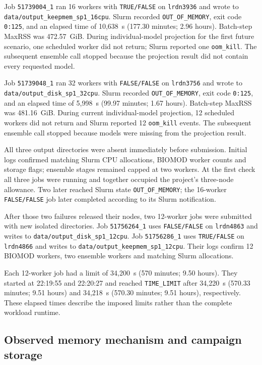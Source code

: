 Job \texttt{51739004\_1} ran 16 workers with \texttt{TRUE/FALSE} on \texttt{lrdn3936} and wrote to \nolinkurl{data/output_keepmem_sp1_16cpu}. Slurm recorded \texttt{OUT\_OF\_MEMORY}, exit code \texttt{0:125}, and an elapsed time of 10,638~s (177.30 minutes; 2.96 hours). Batch-step MaxRSS was 472.57~GiB. During individual-model projection for the first future scenario, one scheduled worker did not return; Slurm reported one \texttt{oom\_kill}. The subsequent ensemble call stopped because the projection result did not contain every requested model.

Job \texttt{51739048\_1} ran 32 workers with \texttt{FALSE/FALSE} on \texttt{lrdn3756} and wrote to \nolinkurl{data/output_disk_sp1_32cpu}. Slurm recorded \texttt{OUT\_OF\_MEMORY}, exit code \texttt{0:125}, and an elapsed time of 5,998~s (99.97 minutes; 1.67 hours). Batch-step MaxRSS was 481.16~GiB. During current individual-model projection, 12 scheduled workers did not return and Slurm reported 12 \texttt{oom\_kill} events. The subsequent ensemble call stopped because models were missing from the projection result.

All three output directories were absent immediately before submission. Initial logs confirmed matching Slurm CPU allocations, BIOMOD worker counts and storage flags; ensemble stages remained capped at two workers. At the first check all three jobs were running and together occupied the project's three-node allowance. Two later reached Slurm state \texttt{OUT\_OF\_MEMORY}; the 16-worker \texttt{FALSE/FALSE} job later completed according to its Slurm notification.

After those two failures released their nodes, two 12-worker jobs were submitted with new isolated directories. Job \texttt{51756264\_1} uses \texttt{FALSE/FALSE} on \texttt{lrdn4863} and writes to \nolinkurl{data/output_disk_sp1_12cpu}. Job \texttt{51756286\_1} uses \texttt{TRUE/FALSE} on \texttt{lrdn4866} and writes to \nolinkurl{data/output_keepmem_sp1_12cpu}. Their logs confirm 12 BIOMOD workers, two ensemble workers and matching Slurm allocations.

Each 12-worker job had a limit of 34,200~s (570 minutes; 9.50 hours). They started at 22:19:55 and 22:20:27 and reached \texttt{TIME\_LIMIT} after 34,220~s (570.33 minutes; 9.51 hours) and 34,218~s (570.30 minutes; 9.51 hours), respectively. These elapsed times describe the imposed limits rather than the complete workload runtime.

\subsection{Observed memory mechanism and campaign storage}

